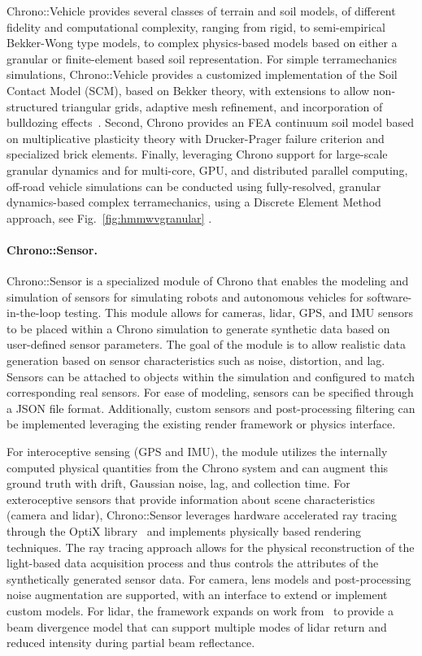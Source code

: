 \documentclass[12pt,twocolumn]{article}
\begin{document}
Chrono::Vehicle provides several classes of terrain and soil models, of different fidelity and computational complexity, ranging from rigid, to semi-empirical Bekker-Wong type models, to complex physics-based models based on either a granular or finite-element based soil representation.  For simple terramechanics simulations, Chrono::Vehicle provides a customized implementation of the Soil Contact Model (SCM), based on Bekker theory, with extensions to allow non-structured triangular grids, adaptive mesh refinement, and incorporation of bulldozing effects~\cite{ChronoSCM2019}.  Second, Chrono provides an FEA continuum soil model based on multiplicative plasticity theory with Drucker-Prager failure criterion and  specialized brick elements. Finally, leveraging Chrono support for large-scale granular dynamics and for multi-core, GPU, and distributed parallel computing, off-road vehicle simulations can be conducted using fully-resolved, granular dynamics-based complex terramechanics, using a Discrete Element Method approach, see Fig.~\ref{fig:hmmwvgranular} \cite{antonioVehicleTireGranMatSim2017, serbanCosimIJVP2019}.


\paragraph{Chrono::Sensor.} Chrono::Sensor is a specialized module of Chrono that enables the modeling and simulation of sensors for simulating robots and autonomous vehicles for software-in-the-loop testing. This module allows for cameras, lidar, GPS, and IMU sensors to be placed within a Chrono simulation to generate synthetic data based on user-defined sensor parameters. The goal of the module is to allow realistic data generation based on sensor characteristics such as noise, distortion, and lag. Sensors can be attached to objects within the simulation and configured to match corresponding real sensors. For ease of modeling, sensors can be specified through a JSON file format. Additionally, custom sensors and post-processing filtering can be implemented leveraging the existing render framework or physics interface. 

For interoceptive sensing (GPS and IMU), the module utilizes the internally computed physical quantities from the Chrono system and can augment this ground truth with drift, Gaussian noise, lag, and collection time. For exteroceptive sensors that provide information about scene characteristics (camera and lidar), Chrono::Sensor leverages hardware accelerated ray tracing through the OptiX library~\cite{optixNVIDIA} and implements physically based rendering techniques. The ray tracing approach allows for the physical reconstruction of the light-based data acquisition process and thus controls the attributes of the synthetically generated sensor data. For camera, lens models and post-processing noise augmentation are supported, with an interface to extend or implement custom models. For lidar, the framework expands on work from~\cite{goodin2018enabling} to provide a beam divergence model that can support multiple modes of lidar return and reduced intensity during partial beam reflectance. 
\end{document}
